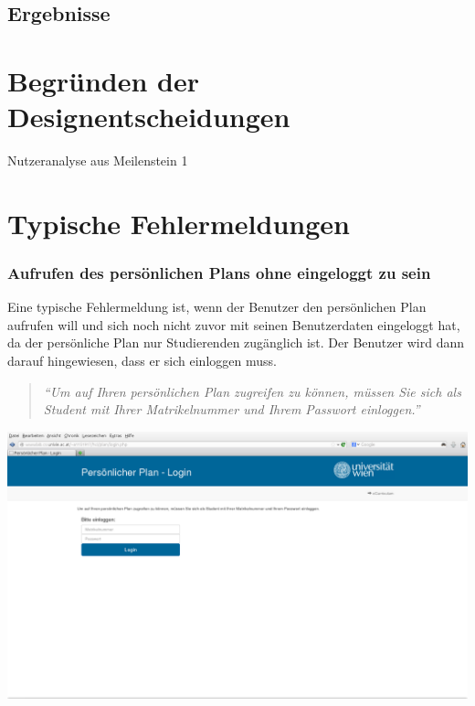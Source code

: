 \documentclass[a4paper,10pt]{scrartcl}
\begin{document}
\subsection*{Ergebnisse}

\section*{Begründen der Designentscheidungen}
Nutzeranalyse aus Meilenstein 1

\section*{Typische Fehlermeldungen}

\subsubsection*{Aufrufen des persönlichen Plans ohne eingeloggt zu sein}

Eine typische Fehlermeldung ist, wenn der Benutzer den persönlichen Plan aufrufen will und sich noch nicht zuvor mit seinen Benutzerdaten eingeloggt hat,
da der persönliche Plan nur Studierenden zugänglich ist. Der Benutzer wird dann darauf hingewiesen, dass er sich einloggen muss.

\begin{quote}
 \textit{``Um auf Ihren persönlichen Plan zugreifen zu können, müssen Sie sich als Student mit Ihrer Matrikelnummer und Ihrem Passwort einloggen.''}
\end{quote} 

\begin{center}
 \includegraphics[scale=0.4]{./fehlermeldung1.png}
\end{center}
\end{document}
